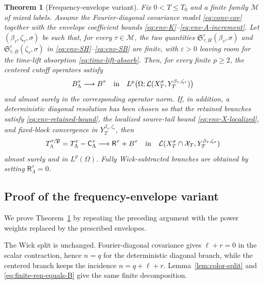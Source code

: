 \documentclass[11pt,reqno]{amsart}
\numberwithin{equation}{section}
\theoremstyle{plain}
\newtheorem{theorem}{Theorem}[section]
\theoremstyle{definition}
\newcommand{\eps}{\varepsilon}
\newcommand{\Ret}{\mathsf R}
\newcommand{\Ctr}{\mathsf C}
\begin{document}
\begin{theorem}[Frequency-envelope variant]\label{thm:envelope}
Fix \(0<T\le T_0\) and a finite family \(\mathcal M\) of mixed labels.
Assume the Fourier-diagonal covariance model \eqref{eq:conv-cov} together with the envelope coefficient bounds \eqref{eq:env-K}--\eqref{eq:env-A-increment}.  Let \((\beta_\tau,\zeta_\tau,\sigma)\) be such that, for every \(\tau\in\mathcal M\), the two quantities \(\mathfrak S_{\tau,H}^{\eps}(\beta_\tau,\sigma)\) and \(\mathfrak S_{\tau,B}^{\eps}(\zeta_\tau,\sigma)\) in \eqref{eq:env-SH}--\eqref{eq:env-SB} are finite, with \(\eps>0\) leaving room for the time-lift absorption \eqref{eq:time-lift-absorb}.  Then, for every finite \(p\ge2\), the centered cutoff operators satisfy
\begin{equation}\label{eq:env-centered-conv}
        B_\Lambda^\tau\longrightarrow B^\tau
        \quad\hbox{in}\quad
        L^p\bigl(\Omega;\mathcal L(X_T^\sigma,Y_T^{\beta_\tau,\zeta_\tau})\bigr)
\end{equation}
and almost surely in the corresponding operator norm.  If, in addition, a deterministic diagonal resolution has been chosen so that the retained branches satisfy \eqref{eq:env-retained-bound}, the localized source-tail bound \eqref{eq:env-X-localized}, and fixed-block convergence in \(Y_T^{\beta_\tau,\zeta_\tau}\), then
\begin{equation}\label{eq:env-assembled-conv}
        T_\Lambda^{\tau,\mathfrak P}=T_\Lambda^\tau-\Ctr^\tau_\Lambda
        \longrightarrow \Ret^\tau+B^\tau
        \quad\hbox{in}\quad
        \mathcal L(X_T^\sigma\cap\mathcal X_T,Y_T^{\beta_\tau,\zeta_\tau})
\end{equation}
almost surely and in \(L^p(\Omega)\).  Fully Wick-subtracted branches are obtained by setting \(\Ret^\tau_\Lambda=0\).
\end{theorem}

\subsection{Proof of the frequency-envelope variant}\label{subsec:proof-envelope}

We prove Theorem~\ref{thm:envelope} by repeating the preceding argument with the power weights replaced by the prescribed envelopes.

The Wick split is unchanged.  Fourier-diagonal covariance gives
\(\ell+r=0\) in the scalar contraction, hence \(n=q\) for the deterministic
diagonal branch, while the centered branch keeps the incidence
\(n=q+\ell+r\).  Lemma~\ref{lem:color-split} and
\eqref{eq:finite-ren-equals-B} give the same finite decomposition.
\end{document}
